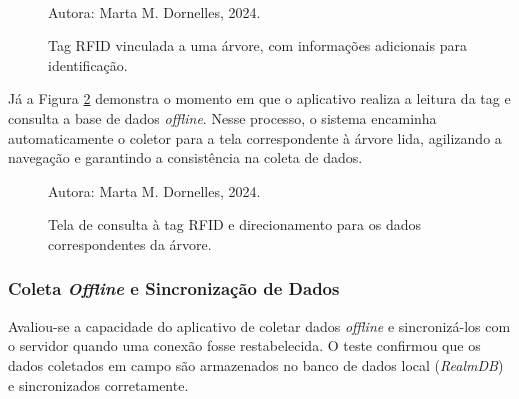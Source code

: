 \begin{figure}[H]
    \centering
    \\
     \caption{Tag RFID vinculada a uma árvore, com informações adicionais para identificação.}
     Autora: Marta M. Dornelles, 2024.
    \label{fig:RfidTest01}
\end{figure}

Já a Figura \ref{fig:RfidTest02} demonstra o momento em que o aplicativo realiza a leitura da tag e consulta a base de dados \textit{offline}. Nesse processo, o sistema encaminha automaticamente o coletor para a tela correspondente à árvore lida, agilizando a navegação e garantindo a consistência na coleta de dados.

\begin{figure}[htb]
    \centering
        \caption{Tela de consulta à tag RFID e direcionamento para os dados correspondentes da árvore.}
     Autora: Marta M. Dornelles, 2024.
    \label{fig:RfidTest02}
\end{figure}

\subsubsection{Coleta \textit{Offline} e Sincronização de Dados}
Avaliou-se a capacidade do aplicativo de coletar dados \textit{offline} e sincronizá-los com o servidor quando uma conexão fosse restabelecida. O teste confirmou que os dados coletados em campo são armazenados no banco de dados local (\textit{RealmDB}) e sincronizados corretamente.

